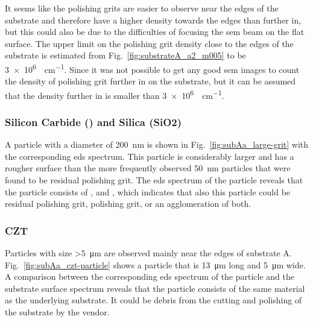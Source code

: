 It seems like the polishing grits are easier to observe near the edges of the substrate and therefore have a higher density towards the edges than further in, but this could also be due to the difficulties of focusing the \ac{sem} beam on the flat surface. The upper limit on the polishing grit density close to the edges of the substrate is estimated from Fig.~\ref{fig:substrateA_a2_m005} to be \SI{3e6}{\particle\centi\metre^{-1}}. Since it was not possible to get any good \ac{sem} images to count the density of polishing grit further in on the substrate, but it can be assumed that the density further in is smaller than \SI{3e6}{\particle\centi\metre^{-1}}.

\subsubsection{Silicon Carbide () and Silica (SiO2)}
A particle with a diameter of \SI{200}{\nano\metre} is shown in Fig.~\ref{fig:subAa_large-grit} with the corresponding \ac{eds} spectrum. This particle is considerably larger and has a rougher surface than the more frequently observed \SI{50}{\nano\metre} particles that were found to be residual polishing grit. The \ac{eds} spectrum of the particle reveals that the particle consists of ,  and , which indicates that also this particle could be residual  polishing grit,  polishing grit, or an agglomeration of both. 


\subsubsection{CZT}
Particles with size \SI{>5}{\micro\metre} are observed mainly near the edges of substrate A. Fig.~\ref{fig:subAa_czt-particle} shows a particle that is \SI{13}{\micro\metre} long and \SI{5}{\micro\metre} wide. A comparison between the corresponding \ac{eds} spectrum of the particle and the substrate surface spectrum reveals that the particle consists of the same material as the underlying substrate. It could be debris from the cutting and polishing of the substrate by the vendor.



